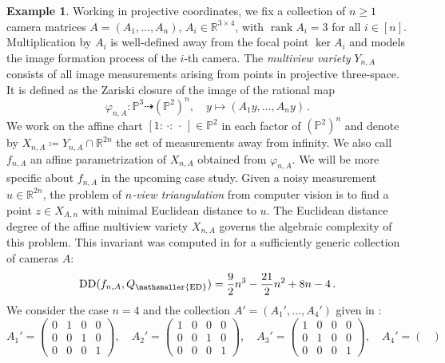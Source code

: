 \documentclass[11pt,reqno]{amsart}
\numberwithin{equation}{section}
\theoremstyle{plain}
\numberwithin{theorem}{section}
\theoremstyle{definition}
\newtheorem{example}[theorem]{Example}
\renewcommand{\P}{\mathbb{P}}
\newcommand{\R}{\mathbb{R}}
\newcommand{\DD}{\operatorname{DD}}
\newcommand{\rank}{\operatorname{rank}}
\newcommand{\mED}{\mathsmaller{\mathrm{ED}}}
\begin{document}
\begin{example}\label{example: 4-view variety}
Working in projective coordinates, we fix a collection of $n\ge 1$ camera matrices $A = (A_1, \dots, A_n)$, $A_i \in \R^{3 \times 4}$, with $\rank A_i=3$ for all $i\in[n]$. Multiplication by $A_i$ is well-defined away from the focal point $\ker A_i$ and models the image formation process of the $i$-th camera.
The {\em multiview variety} $Y_{n,A}$ consists of all image measurements arising from points in projective three-space. It is defined as the Zariski closure of the image of the rational map
\[
\varphi_{n,A} \colon \P^3 \dashrightarrow (\P^2)^n, \quad
y \mapsto (A_1 y, \dots, A_n y)\,.
\]
We work on the affine chart $[1:\,\cdot:\,\cdot\,]\in\P^2$ in each factor of $(\P^2)^n$ and denote by $X_{n,A} \coloneqq Y_{n,A} \cap \R^{2n}$ the set of measurements away from infinity. We also call $f_{n,A}$ an affine parametrization of $X_{n,A}$ obtained from $\varphi_{n,A}$. We will be more specific about $f_{n,A}$ in the upcoming case study.
Given a noisy measurement $u\in \R^{2n}$, the problem of {\em $n$-view triangulation} from computer vision is to find a point $z\in X_{A,n}$ with minimal Euclidean distance to $u$. The Euclidean distance degree of the affine multiview variety $X_{n,A}$ governs the algebraic complexity of this problem. This invariant was computed in \cite[Eq. (4.1)]{maxim2020euclidean} for a sufficiently generic collection of cameras $A$:
\begin{equation}\label{eq: EDD multiview variety}
    \DD(f_{n,A},Q_\mED) = \frac{9}{2}n^3-\frac{21}{2}n^2+8n-4\,.
\end{equation}
We consider the case $n=4$ and the collection $A'=(A_1',\dots,A_4')$ given in \cite[Section 4]{aholt2013hilbert}:
\[
A_1' = 
\begin{pmatrix}
0 & 1 & 0 & 0\\
0 & 0 & 1 & 0\\
0 & 0 & 0 & 1
\end{pmatrix}, \quad
A_2' = 
\begin{pmatrix}
1 & 0 & 0 & 0\\
0 & 0 & 1 & 0\\
0 & 0 & 0 & 1
\end{pmatrix}, \quad
A_3' = 
\begin{pmatrix}
1 & 0 & 0 & 0\\
0 & 1 & 0 & 0\\
0 & 0 & 0 & 1
\end{pmatrix}, \quad
A_4' = 
\begin{pmatrix}

\end{pmatrix}\]
\end{example}
\end{document}
